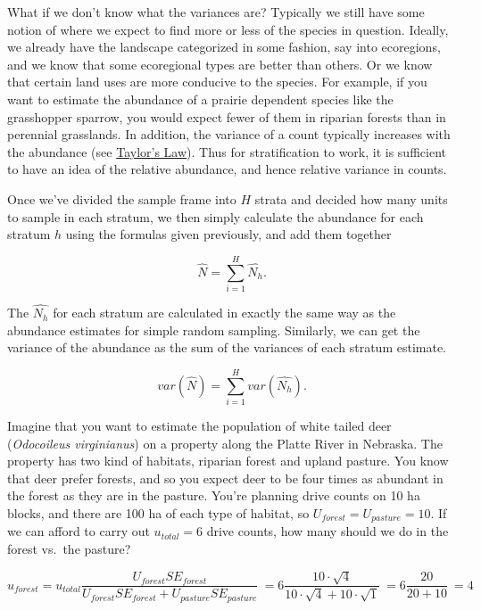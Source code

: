 \documentclass[]{book}
\theoremstyle{definition}
\theoremstyle{definition}
\theoremstyle{definition}
\theoremstyle{remark}
\begin{document}
What if we don't know what the variances are? Typically we still have
some notion of where we expect to find more or less of the species in
question. Ideally, we already have the landscape categorized in some
fashion, say into ecoregions, and we know that some ecoregional types
are better than others. Or we know that certain land uses are more
conducive to the species. For example, if you want to estimate the
abundance of a prairie dependent species like the grasshopper sparrow,
you would expect fewer of them in riparian forests than in perennial
grasslands. In addition, the variance of a count typically increases
with the abundance (see \protect\hyperlink{taylors-law}{Taylor's Law}).
Thus for stratification to work, it is sufficient to have an idea of the
relative abundance, and hence relative variance in counts.

Once we've divided the sample frame into \(H\) strata and decided how
many units to sample in each stratum, we then simply calculate the
abundance for each stratum \(h\) using the formulas given previously,
and add them together

\begin{equation}
   \hat{N} = \sum_{i=1}^{H}{\hat{N_h}}.
   \label{eq:abundanceStratified}
\end{equation}

The \(\hat{N_h}\) for each stratum are calculated in exactly the same
way as the abundance estimates for simple random sampling. Similarly, we
can get the variance of the abundance as the sum of the variances of
each stratum estimate.

\begin{equation}
   var\left(\hat{N}\right) = \sum_{i=1}^{H}{var\left(\hat{N_h}\right)}.
   \label{eq:abundancevarianceStratfied}
\end{equation}

Imagine that you want to estimate the population of white tailed deer
(\emph{Odocoileus virginianus}) on a property along the Platte River in
Nebraska. The property has two kind of habitats, riparian forest and
upland pasture. You know that deer prefer forests, and so you expect
deer to be four times as abundant in the forest as they are in the
pasture. You're planning drive counts on 10 ha blocks, and there are 100
ha of each type of habitat, so \(U_{forest} = U_{pasture} = 10\). If we
can afford to carry out \(u_{total} = 6\) drive counts, how many should
we do in the forest vs.~the pasture?

\begin{equation}
  u_{forest} = u_{total} \frac{U_{forest} SE_{forest}}
               {U_{forest} SE_{forest} + U_{pasture} SE_{pasture}} \
           = 6 \frac{10\cdot \sqrt{4}}
                  {10 \cdot \sqrt{4} + 10 \cdot \sqrt{1}} \
           = 6 \frac{20}
                  {20 + 10} \
           = 4
\end{equation}
\end{document}
